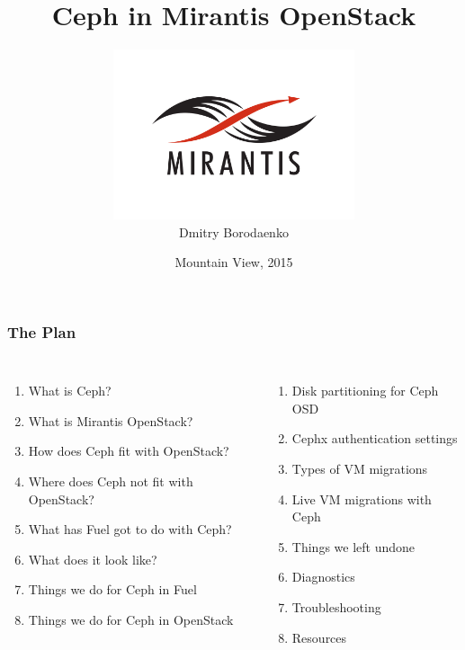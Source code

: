 \documentclass[hyperref=unicode,utf8,xcolor=pst,aspectratio=169]{beamer}
\title{\fontsize{26}{0}\selectfont Ceph in Mirantis OpenStack}
\author{\vspace{-1mm}\includegraphics[height=5cm]{Vector_RGB_MirantisLogo}\\Dmitry Borodaenko\vspace{-10mm}}
\date{Mountain View, 2015}
\newcounter{savedenum}
\newcommand*{\saveenum}{\setcounter{savedenum}{\theenumi}}
\newcommand*{\resume}{\setcounter{enumi}{\thesavedenum}}
\begin{document}
\begin{frame}
	\titlepage
\end{frame}

\begin{frame}
	\frametitle{The Plan}
	\begin{columns}[T]
		\begin{enumerate}
			\item What is Ceph?
			\item What is Mirantis OpenStack?
			\item How does Ceph fit with OpenStack?
			\item Where does Ceph not fit with OpenStack?
			\item What has Fuel got to do with Ceph?
			\item What does it look like?
			\item Things we do for Ceph in Fuel
			\item Things we do for Ceph in OpenStack
			\saveenum
		\end{enumerate}

		\begin{enumerate}
			\resume
			\item Disk partitioning for Ceph OSD
			\item Cephx authentication settings
			\item Types of VM migrations
			\item Live VM migrations with Ceph
			\item Things we left undone
			\item Diagnostics
			\item Troubleshooting
			\item Resources
		\end{enumerate}
	\end{columns}
\end{frame}
\end{document}
